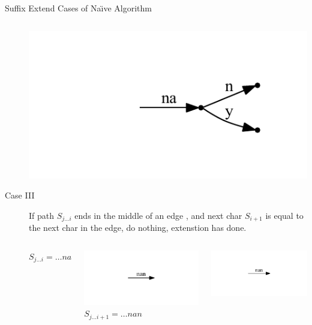 \begin{frame}[shrink=20]{Suffix Extend Cases of Na\"{\i}ve Algorithm}
\begin{description}
\begin{columns}
\includegraphics[trim=80pt 35pt 80pt 35pt]{nany.pdf}
\end{columns}
\item[Case III] If path $S_{j...i}$ ends in the middle of an edge ,
and next char $S_{i+1}$ is \alert{equal} to the next char in the edge,
do nothing, extenstion has done.
\begin{columns}
$S_{j\ldots i} = \ldots na$ 

\includegraphics[trim=80pt 35pt 80pt 35pt]{nan_.pdf}
{\huge \MVRightarrow}
$S_{j\ldots i+1} = \ldots nan$ 

\includegraphics[trim=80pt 40pt 80pt 35pt]{nan_.pdf}
\end{columns}
\end{description}
\end{frame}

